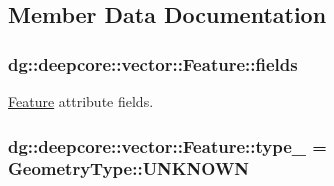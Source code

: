 \subsection{Member Data Documentation}
\subsubsection[{\texorpdfstring{fields}{fields}}]{ dg\+::deepcore\+::vector\+::\+Feature\+::fields}\hypertarget{classdg_1_1deepcore_1_1vector_1_1_feature_a932740031038833666cd2afd1ada92f4}{}\label{classdg_1_1deepcore_1_1vector_1_1_feature_a932740031038833666cd2afd1ada92f4}


\hyperlink{classdg_1_1deepcore_1_1vector_1_1_feature}{Feature} attribute fields. 

\subsubsection[{\texorpdfstring{type\+\_\+}{type_}}]{ dg\+::deepcore\+::vector\+::\+Feature\+::type\+\_\+ = {\bf Geometry\+Type\+::\+U\+N\+K\+N\+O\+WN}\hspace{0.3cm}{\ttfamily [protected]}}\hypertarget{classdg_1_1deepcore_1_1vector_1_1_feature_a2454e027df5975864b2adc3a22d650ba}{}\label{classdg_1_1deepcore_1_1vector_1_1_feature_a2454e027df5975864b2adc3a22d650ba}
